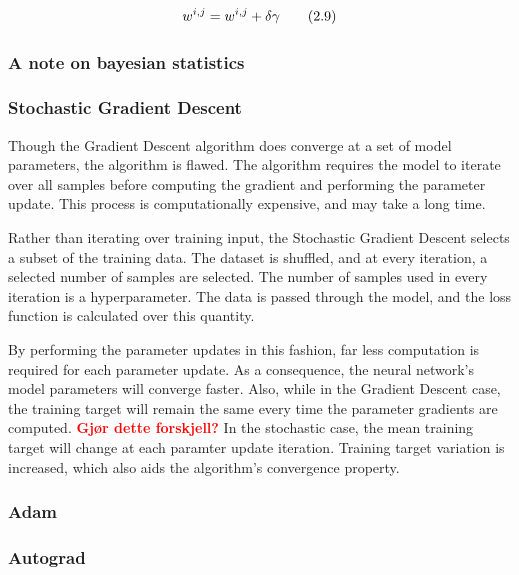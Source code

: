 \[ w^{i, \space j} = w^{i, \space j} + \delta \gamma \tag{2.9}  \label{func:gradientUpdate} \]



\subsubsection{A note on bayesian statistics}

\subsubsection{Stochastic Gradient Descent}

Though the Gradient Descent algorithm does converge at a set of model parameters, the algorithm is flawed.
The algorithm requires the model to iterate over all samples before computing the gradient and performing the parameter update.
This process is computationally expensive, and may take a long time. 

Rather than iterating over training input, the Stochastic Gradient Descent selects a subset of the training data.
The dataset is shuffled, and at every iteration, a selected number of samples are selected. 
The number of samples used in every iteration is a hyperparameter.
The data is passed through the model, and the loss function is calculated over this quantity.

By performing the parameter updates in this fashion, far less computation is required for each parameter update.
As a consequence, the neural network's model parameters will converge faster. 
Also, while in the Gradient Descent case, the training target will remain the same every time the parameter gradients are computed.
\textcolor{red}{\textbf{Gjør dette forskjell?}} In the stochastic case, the mean training target will change at each paramter update iteration. 
Training target variation is increased, which also aids the algorithm's convergence property.




\subsubsection{Adam}

\subsubsection{Autograd}







